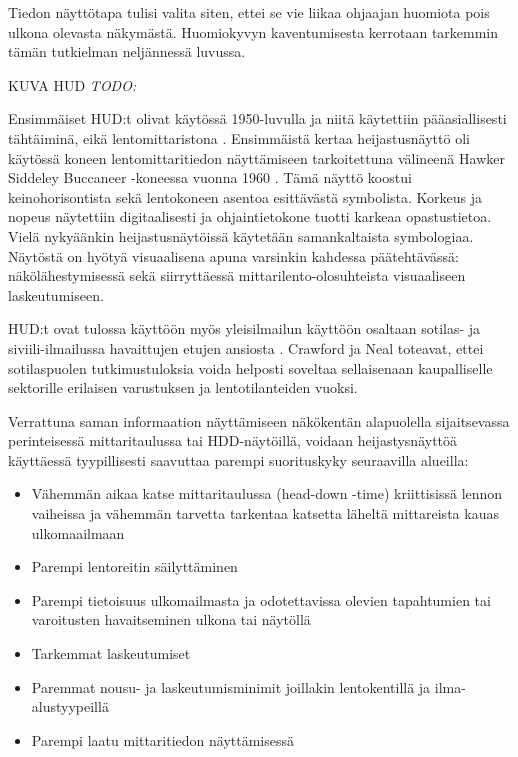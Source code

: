\documentclass[utf8,bachelor,manualbib]{gradu3}
\begin{document}
Tiedon näyttötapa tulisi valita siten, ettei se vie liikaa ohjaajan huomiota pois ulkona olevasta näkymästä. Huomiokyvyn kaventumisesta kerrotaan tarkemmin tämän tutkielman neljännessä luvussa.

KUVA HUD \emph{TODO:}

Ensimmäiset HUD:t olivat käytössä 1950-luvulla ja niitä käytettiin pääasiallisesti tähtäiminä, eikä lentomittaristona \citep{crawfordneal2006}. Ensimmäistä kertaa heijastusnäyttö oli käytössä koneen lentomittaritiedon näyttämiseen tarkoitettuna välineenä Hawker Siddeley Buccaneer -koneessa vuonna 1960 \citep{weintraubensing1992}. Tämä näyttö koostui keinohorisontista sekä lentokoneen asentoa esittävästä symbolista. Korkeus ja nopeus näytettiin digitaalisesti ja ohjaintietokone tuotti karkeaa opastustietoa. Vielä nykyäänkin heijastusnäytöissä käytetään samankaltaista symbologiaa. Näytöstä on hyötyä visuaalisena apuna varsinkin kahdessa päätehtävässä: näkölähestymisessä sekä siirryttäessä mittarilento-olosuhteista visuaaliseen laskeutumiseen. \citep{crawfordneal2006}

HUD:t ovat tulossa käyttöön myös yleisilmailun käyttöön osaltaan sotilas- ja siviili-ilmailussa havaittujen etujen ansiosta \citep{ververswickens1998}. Crawford ja Neal \citeyearpar{crawfordneal2006} toteavat, ettei sotilaspuolen tutkimustuloksia voida helposti soveltaa sellaisenaan kaupalliselle sektorille erilaisen varustuksen ja lentotilanteiden vuoksi.

Verrattuna saman informaation näyttämiseen näkökentän alapuolella sijaitsevassa perinteisessä mittaritaulussa tai HDD-näytöillä, voidaan heijastysnäyttöä käyttäessä tyypillisesti saavuttaa parempi suorituskyky seuraavilla alueilla:

\begin{itemize}
\item Vähemmän aikaa katse mittaritaulussa (head-down -time) kriittisissä lennon vaiheissa ja vähemmän tarvetta tarkentaa katsetta läheltä mittareista kauas ulkomaailmaan \citep{maywickens1995}
\item Parempi lentoreitin säilyttäminen \citep{fischerym1980, lauberym1982, wickenslong1995}
\item Parempi tietoisuus ulkomailmasta ja odotettavissa olevien tapahtumien tai varoitusten havaitseminen ulkona tai näytöllä \citep{faddenym2000, fischer1979, larishwickens1991, maywickens1995, wickenslong1995}
\item Tarkemmat laskeutumiset \citep{naish1964}
\item Paremmat nousu- ja laskeutumisminimit joillakin lentokentillä ja ilma-alustyypeillä \citep{crawfordneal2006}
\item Parempi laatu mittaritiedon näyttämisessä \citep{maywickens1995}
\end{itemize}
\end{document}

